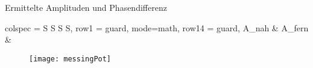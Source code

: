 \begin{table}[H]
    \centering
    \caption{Ermittelte Amplituden und Phasendifferenz}
    \label{tab:maßePuppe}
    \begin{tblr}{
        colspec = {S S S S},
        row{1} = {guard, mode=math},
        row{14} = {guard},
      }
      \toprule
        A_{nah} & A_{fern} & 
      \midrule
      \bottomrule
    \end{tblr}
  \end{table}

  \begin{figure}
    \centering
    \texttt{[image: messingPot]}
  \end{figure}
  